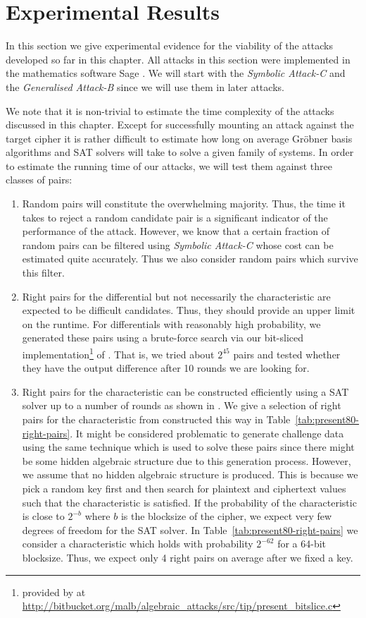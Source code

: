 \section{Experimental Results}
\label{sec:adc}
In this section we give experimental evidence for the viability of the attacks developed so far in this chapter. All attacks in this section were implemented in the mathematics software Sage \cite{sage}. We will start with the \emph{Symbolic Attack-C} and the \emph{Generalised Attack-B} since we will use them in later attacks.

We note that it is non-trivial to estimate the time complexity of the attacks discussed in this chapter. Except for successfully mounting an attack against the target cipher it is rather difficult to estimate how long on average Gröbner basis algorithms and SAT solvers will take to solve a given family of systems. In order to estimate the running time of our attacks, we will test them against three classes of pairs:
\begin{enumerate}
 \item Random pairs will constitute the overwhelming majority. Thus, the time it takes to reject a random candidate pair is a significant indicator of the performance of the attack. However, we know that a certain fraction of random pairs can be filtered using \emph{Symbolic Attack-C} whose cost can be estimated quite accurately. Thus we also consider random pairs which survive this filter.
 \item Right pairs for the differential but not necessarily the characteristic are expected to be difficult candidates. Thus, they should provide an upper limit on the runtime. For differentials with reasonably high probability, we generated these pairs using a brute-force search via our bit-sliced implementation\footnote{provided by at \url{http://bitbucket.org/malb/algebraic_attacks/src/tip/present_bitslice.c}} of \PRESENT. That is, we tried about $2^{45}$ pairs and tested whether they have the output difference after 10 rounds we are looking for.
 \item Right pairs for the characteristic can be constructed efficiently using a SAT solver up to a number of rounds as shown in \cite{alg-des}. We give a selection of right pairs for the characteristic from \cite{present-dc:africacrypt} constructed this way in Table~\ref{tab:present80-right-pairs}. It might be considered problematic to generate challenge data using the same technique which is used to solve these pairs since there might be some hidden algebraic structure due to this generation process. However, we assume that no hidden algebraic structure is produced. This is because we pick a random key first and then search for plaintext and ciphertext values such that the characteristic is satisfied. If the probability of the characteristic is close to $2^{-b}$ where $b$ is the blocksize of the cipher, we expect very few degrees of freedom for the SAT solver. In Table~\ref{tab:present80-right-pairs} we consider a characteristic which holds with probability $2^{-62}$ for a 64-bit blocksize. Thus, we expect only 4 right pairs on average after we fixed a key.
\end{enumerate}



